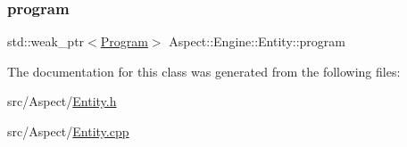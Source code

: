 \mbox{\label{class_aspect_1_1_engine_1_1_entity_a39a0c787c384f192878e9c16f566b892}} 
\subsubsection{\texorpdfstring{program}{program}}
{\footnotesize\ttfamily std\+::weak\+\_\+ptr$<$\mbox{\hyperlink{class_aspect_1_1_engine_1_1_program}{Program}}$>$ Aspect\+::\+Engine\+::\+Entity\+::program}



The documentation for this class was generated from the following files\+:\begin{DoxyCompactItemize}
\item 
src/\+Aspect/\mbox{\hyperlink{_entity_8h}{Entity.\+h}}\item 
src/\+Aspect/\mbox{\hyperlink{_entity_8cpp}{Entity.\+cpp}}\end{DoxyCompactItemize}
